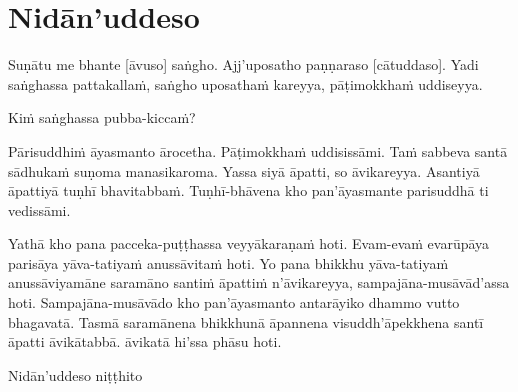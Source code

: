 \section{Nidān'uddeso}
\label{nidan'uddeso}

Suṇātu me bhante [āvuso] saṅgho. Ajj’uposatho paṇṇaraso [cātuddaso]. Yadi saṅghassa pattakallaṁ, saṅgho uposathaṁ kareyya, pāṭimokkhaṁ uddiseyya.

Kiṁ saṅghassa pubba-kiccaṁ?

Pārisuddhiṁ āyasmanto ārocetha. Pāṭimokkhaṁ uddisissāmi. Taṁ sabbeva santā sādhukaṁ suṇoma manasikaroma. Yassa siyā āpatti, so āvikareyya. Asantiyā āpattiyā tuṇhī bhavitabbaṁ. Tuṇhī-bhāvena kho pan’āyasmante parisuddhā ti vedissāmi.

Yathā kho pana pacceka-puṭṭhassa veyyākaraṇaṁ hoti. Evam-evaṁ evarūpāya parisāya yāva-tatiyaṁ anussāvitaṁ hoti. Yo pana bhikkhu yāva-tatiyaṁ anussāviyamāne saramāno santiṁ āpattiṁ n’āvikareyya, sampajāna-musāvād’assa hoti. Sampajāna-musāvādo kho pan’āyasmanto antarāyiko dhammo vutto bhagavatā. Tasmā saramānena bhikkhunā āpannena visuddh’āpekkhena santī āpatti āvikātabbā. āvikatā hi’ssa phāsu hoti.

\medskip

\begin{outro}
  Nidān’uddeso niṭṭhito
\end{outro}

\clearpage
